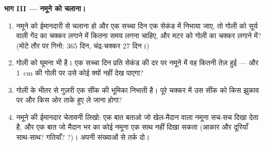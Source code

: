 \begin{problem}[{सप्ताहांत समस्या --- कक्षा खेल के मैदान पर
सूर्य--पृथ्वी--चंद्रमा तंत्र बनाती है; काँच की गोलियाँ, काली मिर्च के
दाने और एक बहुत लंबी सैर; और नमूने में शामिल होता झुकाव}]
\medskip\noindent\textbf{भाग III --- नमूने को चलाना।}
\begin{enumerate}[resume]
  \item नमूने को ईमानदारी से चलाना हो और एक सच्चा दिन एक सेकंड में
        निभाया जाए, तो गोली को सूर्य वाली गेंद का चक्कर लगाने में
        कितना समय लगना चाहिए, और मटर को गोली का चक्कर लगाने में?
        (मोटे तौर पर गिनो:  $365$ दिन, चंद्र-चक्कर $27$ दिन।)
  \item गोली को घूमना भी है। एक सच्चा दिन प्रति सेकंड की दर पर नमूने
        में वह कितनी तेज़ हुई --- और \qty{1}{cm} की गोली पर उसे कोई
        क्यों नहीं देख पाएगा?
  \item गोली के भीतर से गुज़री एक सींक  की भूमिका निभाती है। पूरे
        चक्कर में उस सींक को किस झुकाव पर और किस ओर ताके हुए ले जाना
        होगा?
  \item नमूने की ईमानदार चेतावनी लिखो: एक बात बताओ जो खेल-मैदान वाला
        नमूना सच-सच दिखा देता है, और एक बात जो मैदान भर का कोई नमूना
        एक साथ नहीं दिखा सकता (आकार और दूरियाँ साथ-साथ? गतियाँ?
        ?)। अपनी संख्याओं से तर्क दो।
\end{enumerate}
\end{problem}
